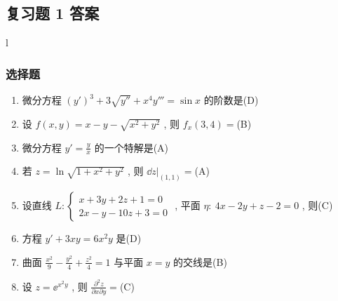 \subsection{复习题 1 答案}
l
\subsubsection{选择题}
\begin{enumerate}
	\item 微分方程 $(y')^3+3\sqrt{y''}+x^4y'''=\sin x$ 的阶数是(\hspace{0.25pc}D\hspace{0.25pc})
	\item 设 $f(x,y)=x-y-\sqrt{x^2+y^2}$ , 则 $f_{x}(3,4)=$(\hspace{0.25pc}B\hspace{0.25pc})
	\item 微分方程 $y'=\frac{y}{x}$ 的一个特解是(\hspace{0.25pc}A\hspace{0.25pc})
	\item 若 $z=\ln\sqrt{1+x^2+y^2}$ , 则 $\left.\dd z\right|_{(1,1)}=$(\hspace{0.25pc}A\hspace{0.25pc})
	\item 设直线 $L:\begin{cases}
	x+3y+2z+1=0\\
	2x-y-10z+3=0
	\end{cases}$ , 平面 $\eta:\ 4x-2y+z-2=0$ , 则(\hspace{0.25pc}C\hspace{0.25pc})
	\item 方程 $y'+3xy=6x^2y$ 是(\hspace{0.25pc}D\hspace{0.25pc})
	\item 曲面 $\frac{x^2}{9}-\frac{y^2}{4}+\frac{z^2}{4}=1$ 与平面 $x=y$ 的交线是(\hspace{0.25pc}B\hspace{0.25pc})
	\item 设 $z=\ee^{x^2y}$ , 则 $\frac{\partial^2z}{\partial x\partial y}=$(\hspace{0.25pc}C\hspace{0.25pc})

\end{enumerate}
